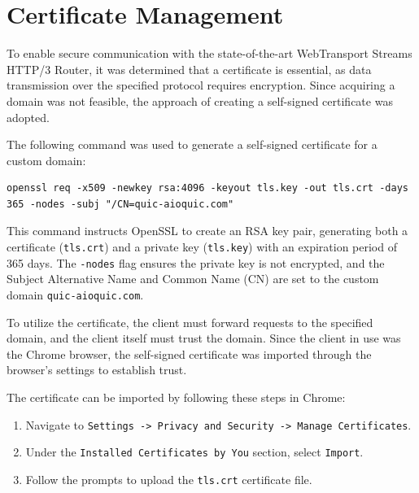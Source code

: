 





\section{Certificate Management}
To enable secure communication with the state-of-the-art WebTransport Streams HTTP/3 Router, it was determined that a certificate is essential, as data transmission over the specified protocol requires encryption. Since acquiring a domain was not feasible, the approach of creating a self-signed certificate was adopted.

The following command was used to generate a self-signed certificate for a custom domain:

\begin{lstlisting}[breaklines=true,basicstyle=\small\ttfamily,frame=single]
openssl req -x509 -newkey rsa:4096 -keyout tls.key -out tls.crt -days 365 -nodes -subj "/CN=quic-aioquic.com"
\end{lstlisting}

This command instructs OpenSSL to create an RSA key pair, generating both a certificate (\texttt{tls.crt}) and a private key (\texttt{tls.key}) with an expiration period of 365 days. The \texttt{-nodes} flag ensures the private key is not encrypted, and the Subject Alternative Name and Common Name (CN) are set to the custom domain \texttt{quic-aioquic.com}.

To utilize the certificate, the client must forward requests to the specified domain, and the client itself must trust the domain. Since the client in use was the Chrome browser, the self-signed certificate was imported through the browser's settings to establish trust.

The certificate can be imported by following these steps in Chrome:

\begin{enumerate}
    \item Navigate to \texttt{Settings -> Privacy and Security -> Manage Certificates}.
    \item Under the \texttt{Installed Certificates by You} section, select \texttt{Import}.
    \item Follow the prompts to upload the \texttt{tls.crt} certificate file.
\end{enumerate}

